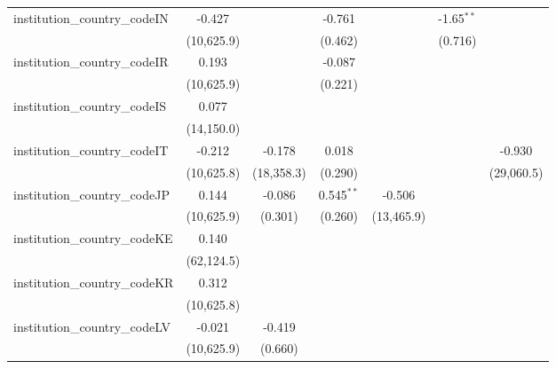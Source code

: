 \begin{tabular}{lcccccc}
   institution\_country\_codeIN          & -0.427        &               & -0.761        &             & -1.65$^{**}$  &   \\   
                                         & (10,625.9)    &               & (0.462)       &             & (0.716)       &   \\   
   institution\_country\_codeIR          & 0.193         &               & -0.087        &             &               &   \\   
                                         & (10,625.9)    &               & (0.221)       &             &               &   \\   
   institution\_country\_codeIS          & 0.077         &               &               &             &               &   \\   
                                         & (14,150.0)    &               &               &             &               &   \\   
   institution\_country\_codeIT          & -0.212        & -0.178        & 0.018         &             &               & -0.930\\   
                                         & (10,625.8)    & (18,358.3)    & (0.290)       &             &               & (29,060.5)\\   
   institution\_country\_codeJP          & 0.144         & -0.086        & 0.545$^{**}$  & -0.506      &               &   \\   
                                         & (10,625.9)    & (0.301)       & (0.260)       & (13,465.9)  &               &   \\   
   institution\_country\_codeKE          & 0.140         &               &               &             &               &   \\   
                                         & (62,124.5)    &               &               &             &               &   \\   
   institution\_country\_codeKR          & 0.312         &               &               &             &               &   \\   
                                         & (10,625.8)    &               &               &             &               &   \\   
   institution\_country\_codeLV          & -0.021        & -0.419        &               &             &               &   \\   
                                         & (10,625.9)    & (0.660)       &               &             &               &   \\   

\end{tabular}
